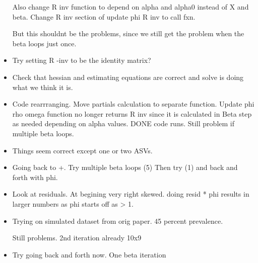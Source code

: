 \documentclass[10pt]{article}
\theoremstyle{definition}
\begin{document}
\begin{itemize}
Also change R inv function to depend on alpha and alpha0 instead of X and beta.
Change R inv section of update phi R inv to call fxn.

But this shouldnt be the problems, since we still get the problem when the beta loops just once.

\item Try setting R -inv to be the identity matrix?

\item Check that hessian and estimating equations are correct and solve is doing what we think it is.

\item Code rearrranging. Move partials calculation to separate function. Update phi rho omega function no longer returns R inv since it is calculated in Beta step as needed depending on alpha values. DONE code runs. Still problem if multiple beta loops.

\item Things seem correct except one or two ASVs.


\item Going back to +. Try multiple beta loops (5) Then try (1) and back and forth with phi.

\item Look at residuals. At begining very right skewed. doing resid * phi results in larger numbers as phi starts off as > 1.

\item Trying on simulated dataset from orig paper. 45 percent prevalence.

Still problems. 2nd iteration already 10x9


\item Try going back and forth now. One beta iteration



\begin{verbatim}


\end{verbatim}
\end{itemize}
\end{document}
